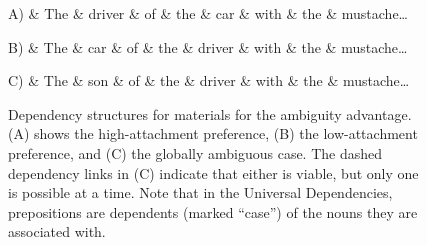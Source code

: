 \documentclass[a4paper, 12pt]{article}
\begin{document}
\begin{figure}[htbp]
\centering
\begin{dependency}[theme=simple, font=\normalsize, label style={font=\normalsize}]
\begin{deptext}[column sep=1em]
    A) \& The \& driver \& of \& the \& car \& with \& the \& mustache\dots\\
\end{deptext}
\end{dependency}

\begin{dependency}[theme=simple, font=\normalsize, label style={font=\normalsize}]
\begin{deptext}[column sep=1em]
    B) \& The \& car \& of \& the \& driver \& with \& the \& mustache\dots\\
\end{deptext}
\end{dependency}

\begin{dependency}[theme=simple, font=\normalsize, label style={font=\normalsize}]
\begin{deptext}[column sep=1em]
    C) \& The \& son \& of \& the \& driver \& with \& the \& mustache\dots\\
\end{deptext}
\end{dependency}
\caption{Dependency structures for materials for the ambiguity advantage. (A)
    shows the high-attachment preference, (B) the low-attachment preference,
    and (C) the globally ambiguous case. The dashed dependency links in (C)
    indicate that either is viable, but only one is possible at a time. Note
    that in the Universal Dependencies, prepositions are dependents (marked
    ``case'') of the nouns they are associated with.}\label{fig:aadeps}
\end{figure}
\end{document}
